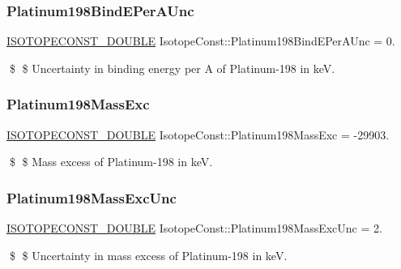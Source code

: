 \subsubsection{\texorpdfstring{Platinum198\+Bind\+E\+Per\+A\+Unc}{Platinum198BindEPerAUnc}}
{\footnotesize\ttfamily \mbox{\hyperlink{group___isotope_const-_macros_ga8f45a7272ce02c0b4c65c44636ed719a}{I\+S\+O\+T\+O\+P\+E\+C\+O\+N\+S\+T\+\_\+\+D\+O\+U\+B\+LE}} Isotope\+Const\+::\+Platinum198\+Bind\+E\+Per\+A\+Unc = 0.}

\$ \$ Uncertainty in binding energy per A of Platinum-\/198 in keV. \mbox{\label{group___isotope_const-_platinum-_pt198_ga3367bc17e56ce17484acb983ea617cea}} 
\subsubsection{\texorpdfstring{Platinum198\+Mass\+Exc}{Platinum198MassExc}}
{\footnotesize\ttfamily \mbox{\hyperlink{group___isotope_const-_macros_ga8f45a7272ce02c0b4c65c44636ed719a}{I\+S\+O\+T\+O\+P\+E\+C\+O\+N\+S\+T\+\_\+\+D\+O\+U\+B\+LE}} Isotope\+Const\+::\+Platinum198\+Mass\+Exc = -\/29903.}

\$ \$ Mass excess of Platinum-\/198 in keV. \mbox{\label{group___isotope_const-_platinum-_pt198_gad8594f66ea9f3e6902f7b54c03eb37f1}} 
\subsubsection{\texorpdfstring{Platinum198\+Mass\+Exc\+Unc}{Platinum198MassExcUnc}}
{\footnotesize\ttfamily \mbox{\hyperlink{group___isotope_const-_macros_ga8f45a7272ce02c0b4c65c44636ed719a}{I\+S\+O\+T\+O\+P\+E\+C\+O\+N\+S\+T\+\_\+\+D\+O\+U\+B\+LE}} Isotope\+Const\+::\+Platinum198\+Mass\+Exc\+Unc = 2.}

\$ \$ Uncertainty in mass excess of Platinum-\/198 in keV. \mbox{\label{group___isotope_const-_platinum-_pt198_gafaaeaddeb21cb4fea56d3618a608c14c}} 
